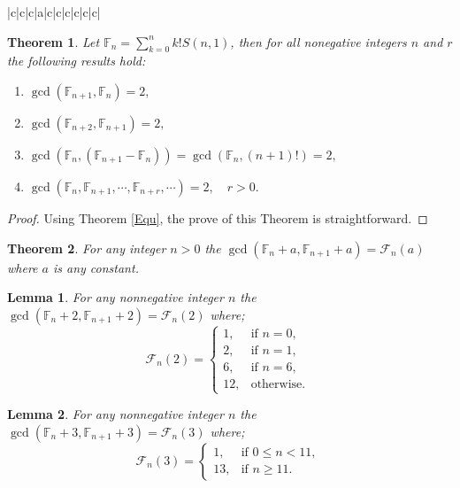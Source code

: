 \documentclass[pdflatex,sn-mathphys-num]{sn-jnl}%
\newtheorem{theorem}{Theorem}
\newtheorem{lemma}{Lemma}
\theoremstyle{thmstyleone}%
\theoremstyle{thmstyletwo}%
\theoremstyle{thmstylethree}%
\begin{document}
\begin{table}[!ht]
\begin{tabular}{|c|c|c|a|c|c|c|c|c|c|}
         
            
    \end{tabular}
    \caption{Some altered $\mathbb{F}_{n}$ sequences}
    \label{table 10}
\end{table}

\begin{theorem}
Let $\mathbb{F}_n=\sum_{k=0}^n k!S(n,1)$, then for all nonegative integers $n$ and $r$ the following results hold:
\begin{enumerate}
    \item  $\gcd(\mathbb{F}_{n+1}, \mathbb{F}_n)=2,$
    \item $\gcd(\mathbb{F}_{n+2}, \mathbb{F}_{n+1})=2,$
    \item $\gcd(\mathbb{F}_{n}, (\mathbb{F}_{n+1}-\mathbb{F}_n))=\gcd(\mathbb{F}_{n}, (n+1)!)=2,$
    \item $\gcd(\mathbb{F}_{n}, \mathbb{F}_{n+1},\cdots, \mathbb{F}_{n+r}, \cdots )=2, \quad r>0.$
\end{enumerate}
\end{theorem}
\begin{proof}
    Using Theorem \ref{Equ}, the prove of this Theorem is straightforward.
\end{proof}



\begin{theorem}
    For any integer $n>0$ the $\gcd(\mathbb{F}_n +a,  \mathbb{F}_{n+1}+a)=\mathcal{F}_n(a)$ where $a$ is any constant.
\end{theorem}

\begin{lemma}
    For any nonnegative integer $n$ the $\gcd(\mathbb{F}_n +2,  \mathbb{F}_{n+1}+2)=\mathcal{F}_n(2)$ where;
\begin{equation*}\mathcal{F}_n(2)=
\begin{cases}
	\text{$1$},    & \text{if $n=0$, }\\
	\text{$2$},  & \text{if $n=1$, }\\
    \text{$6$},  & \text{if $n=6$, }\\
     \text{$12$},  & \text{otherwise. }
\end{cases}
 \end{equation*}
\end{lemma}


\begin{lemma}
    For any nonnegative integer $n$ the $\gcd(\mathbb{F}_n +3,  \mathbb{F}_{n+1}+3)=\mathcal{F}_n(3)$ where;
\begin{equation*}\mathcal{F}_n(3)=
\begin{cases}
	\text{$1$},    & \text{if $0\leq n<11$, }\\
	\text{$13$},  & \text{if $n\geq11 $. }
\end{cases}
 \end{equation*}
    
\end{lemma}
\end{document}
